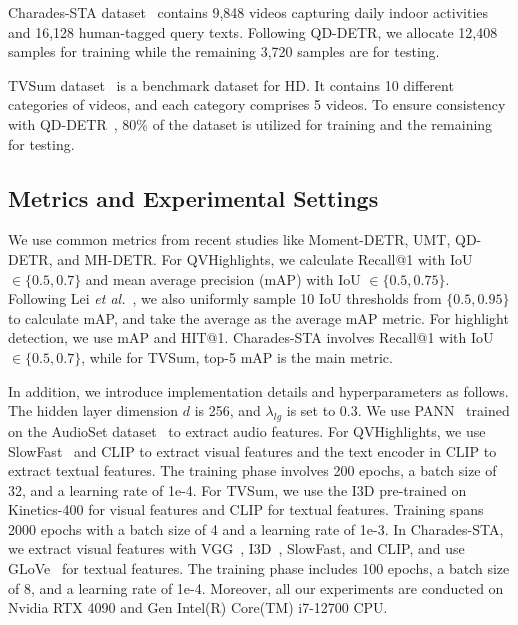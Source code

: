 Charades-STA dataset~\cite{gao2017tall} contains 9,848 videos capturing daily indoor activities and 16,128 human-tagged query texts. Following QD-DETR\cite{moon2023query}, we allocate 12,408 samples for training while the remaining 3,720 samples are for testing.

TVSum dataset~\cite{song2015tvsum} is a benchmark dataset for HD. It contains 10 different categories of videos, and each category comprises 5 videos. To ensure consistency with QD-DETR~\cite{moon2023query},  80\% of the dataset is utilized for training and the remaining for testing.

\subsection{Metrics and Experimental Settings}
We use common metrics from recent studies like Moment-DETR, UMT, QD-DETR, and MH-DETR. For QVHighlights, we calculate Recall@1 with IoU $\in \{0.5, 0.7\}$ and mean average precision (mAP) with IoU $\in \{0.5, 0.75\}$. Following Lei \emph{et al.}~\cite{lei2021detecting}, we also uniformly sample 10 IoU thresholds from $\{0.5, 0.95\}$ to calculate mAP, and take the average as the average mAP metric. For highlight detection, we use mAP and HIT@1. Charades-STA involves Recall@1 with IoU $\in \{0.5, 0.7\}$, while for TVSum, top-5 mAP is the main metric.

In addition, we introduce implementation details and hyperparameters as follows. The hidden layer dimension $d$ is 256, and $\lambda_{lg}$ is set to 0.3. We use PANN~\cite{DBLP:journals/taslp/KongCIWWP20} trained on the AudioSet dataset~\cite{DBLP:conf/icassp/GemmekeEFJLMPR17} to extract audio features.
For QVHighlights, we use SlowFast~\cite{DBLP:journals/corr/abs-1812-03982} and CLIP to extract visual features and the text encoder in CLIP to extract textual features. The training phase involves 200 epochs, a batch size of 32, and a learning rate of 1e-4.
For TVSum, we use the I3D pre-trained on Kinetics-400 for visual features and CLIP for textual features. Training spans 2000 epochs with a batch size of 4 and a learning rate of 1e-3.
In Charades-STA, we extract visual features with VGG~\cite{DBLP:journals/corr/SimonyanZ14a}, I3D~\cite{DBLP:conf/cvpr/CarreiraZ17}, SlowFast, and CLIP, and use GLoVe~\cite{DBLP:conf/emnlp/PenningtonSM14}  for textual features. The training phase includes 100 epochs, a batch size of 8, and a learning rate of 1e-4. Moreover, all our experiments are conducted on Nvidia RTX 4090 and Gen Intel(R) Core(TM) i7-12700 CPU.

